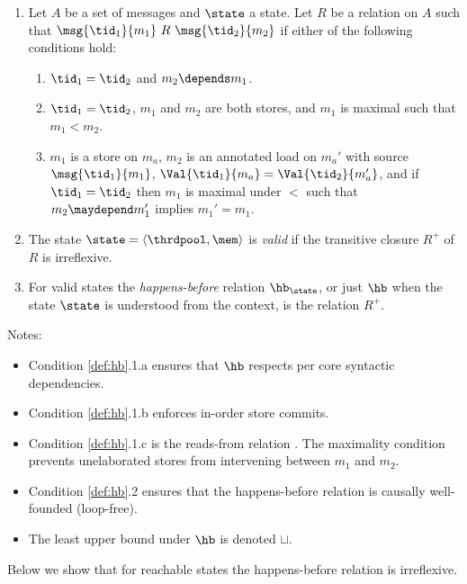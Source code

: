 \begin{definition}
\label{def:hb}
\mbox{}
\begin{enumerate}
\item Let $A$ be a set of messages and $\state$ a state. Let  $R$ be a relation on $A$ such that $\msg{\tid_1}{m_1}\ R\ \msg{\tid_2}{m_2}$ if either of the following conditions hold:
\begin{enumerate}
\item $\tid_1 = \tid_2$ and $m_2 \depends m_1$.
\item $\tid_1 = \tid_2$, $m_1$ and $m_2$ are both stores, and $m_1$ is maximal such that $m_1 < m_2$. 
\item $m_1$ is a store on $m_a$, $m_2$ is an annotated load on $m_a'$ with source $\msg{\tid_1}{m_1}$, $\Val{\tid_1}{m_a}=\Val{\tid_2}{m_a'}$, and if $\tid_1=\tid_2$ then $m_1$ is maximal under $<$ such that $m_2\maydepend m_1'$ implies $m_1' = m_1$.
\end{enumerate}
\item The state $\state=\langle \thrdpool,\mem\rangle$ is \emph{valid} if the
transitive closure $R^+$ of $R$ is irreflexive.
\item
For valid states the \emph{happens-before} relation $\hb_\state$, or just $\hb$ when the state $\state$ is understood from the context, is the relation $R^+$.
\end{enumerate}
\end{definition}

Notes:
\begin{itemize}
\item Condition \ref{def:hb}.1.a ensures that $\hb$ respects per core syntactic dependencies.
\item Condition \ref{def:hb}.1.b enforces in-order store commits.
\item Condition \ref{def:hb}.1.c is the reads-from relation \cite{readsfrom}.
The maximality condition prevents unelaborated stores from intervening between $m_1$ and $m_2$. 
\item Condition \ref{def:hb}.2 ensures that the happens-before relation is causally well-founded (loop-free).
\item The least upper bound under $\hb$ is denoted $\sqcup$.
\end{itemize}
%
Below we show that for reachable states the happens-before relation is irreflexive. 

